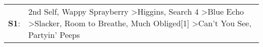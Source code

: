 \begin{supertabular}{p{0.03\textwidth}p{0.92\textwidth}}
 \textbf{S1}:  &  2nd Self\textsuperscript{}, \enspace Wappy Sprayberry\textsuperscript{} \textgreater \enspace Higgins\textsuperscript{}, \enspace Search 4\textsuperscript{} \textgreater \enspace Blue Echo\textsuperscript{} \textgreater \enspace Slacker\textsuperscript{}, \enspace Room to Breathe\textsuperscript{}, \enspace Much Obliged[1]\textsuperscript{} \textgreater \enspace Can't You See\textsuperscript{}, \enspace Partyin' Peeps\textsuperscript{}  \enspace  \\
\end{supertabular}

